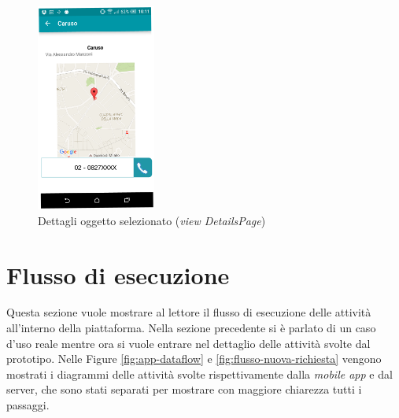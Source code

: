 \begin{figure}[ht]
	\centering
	\includegraphics[width=0.35\textwidth]{4-progettazione-alto-livello/Immagini/details_caso_d'uso.pdf}
	\caption{Dettagli oggetto selezionato (\emph{view DetailsPage})}\label{fig:usecase-details}
\end{figure} 



\section{Flusso di esecuzione\label{sec:flusso-richiesta}}

Questa sezione vuole mostrare al lettore il flusso di esecuzione delle attività all'interno della piattaforma. Nella sezione precedente si è parlato di un caso d'uso reale mentre ora si vuole entrare nel dettaglio delle attività svolte dal prototipo. Nelle Figure \ref{fig:app-dataflow} e \ref{fig:flusso-nuova-richiesta} vengono mostrati i diagrammi delle attività svolte rispettivamente dalla \emph{mobile app} e dal server, che sono stati separati per mostrare con maggiore chiarezza tutti i passaggi.

